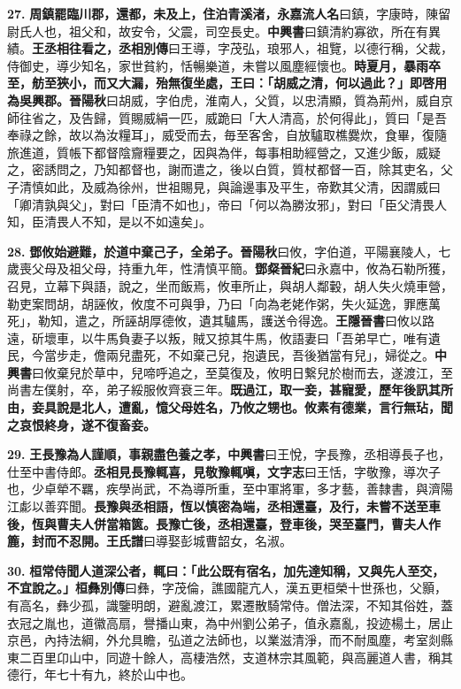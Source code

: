 \textbf{27.} \textbf{周鎮罷臨川郡，還都，未及上，住泊青溪渚，}{\footnotesize \textbf{永嘉流人名}曰鎮，字康時，陳留尉氏人也，祖父和，故安令，父震，司空長史。\textbf{中興書}曰鎮清約寡欲，所在有異績。}\textbf{王丞相往看之，}{\footnotesize \textbf{丞相別傳}曰王導，字茂弘，琅邪人，祖覽，以德行稱，父裁，侍御史，導少知名，家世貧約，恬暢樂道，未嘗以風塵經懷也。}\textbf{時夏月，暴雨卒至，舫至狹小，而又大漏，殆無復坐處，王曰：「胡威之清，何以過此？」即啓用為吳興郡。}{\footnotesize \textbf{晉陽秋}曰胡威，字伯虎，淮南人，父質，以忠清顯，質為荊州，威自京師往省之，及告歸，質賜威絹一匹，威跪曰「大人清高，於何得此」，質曰「是吾奉祿之餘，故以為汝糧耳」，威受而去，毎至客舍，自放驢取樵爨炊，食畢，復隨旅進道，質帳下都督陰齎糧要之，因與為伴，每事相助經營之，又進少飯，威疑之，密誘問之，乃知都督也，謝而遣之，後以白質，質杖都督一百，除其吏名，父子清慎如此，及威為徐州，世祖賜見，與論邊事及平生，帝歎其父清，因謂威曰「卿清孰與父」，對曰「臣清不如也」，帝曰「何以為勝汝邪」，對曰「臣父清畏人知，臣清畏人不知，是以不如遠矣」。}

\textbf{28.} \textbf{鄧攸始避難，於道中棄己子，全弟子。}{\footnotesize \textbf{晉陽秋}曰攸，字伯道，平陽襄陵人，七歲喪父母及祖父母，持重九年，性清慎平簡。\textbf{鄧粲晉紀}曰永嘉中，攸為石勒所獲，召見，立幕下與語，說之，坐而飯焉，攸車所止，與胡人鄰轂，胡人失火燒車營，勒吏案問胡，胡誣攸，攸度不可與爭，乃曰「向為老姥作粥，失火延逸，罪應萬死」，勒知，遣之，所誣胡厚德攸，遺其驢馬，護送令得逸。\textbf{王隱晉書}曰攸以路遠，斫壞車，以牛馬負妻子以叛，賊又掠其牛馬，攸語妻曰「吾弟早亡，唯有遺民，今當步走，儋兩兒盡死，不如棄己兒，抱遺民，吾後猶當有兒」，婦從之。\textbf{中興書}曰攸棄兒於草中，兒啼呼追之，至莫復及，攸明日繋兒於樹而去，遂渡江，至尚書左僕射，卒，弟子綏服攸齊衰三年。}\textbf{既過江，取一妾，甚寵愛，歷年後訊其所由，妾具說是北人，遭亂，憶父母姓名，乃攸之甥也。攸素有德業，言行無玷，聞之哀恨終身，遂不復畜妾。}

\textbf{29.} \textbf{王長豫為人謹順，事親盡色養之孝，}{\footnotesize \textbf{中興書}曰王悅，字長豫，丞相導長子也，仕至中書侍郎。}\textbf{丞相見長豫輒喜，見敬豫輒嗔，}{\footnotesize \textbf{文字志}曰王恬，字敬豫，導次子也，少卓犖不羈，疾學尚武，不為導所重，至中軍將軍，多才藝，善隸書，與濟陽江虨以善弈聞。}\textbf{長豫與丞相語，恆以慎密為端，丞相還臺，及行，未嘗不送至車後，恆與曹夫人併當箱篋。長豫亡後，丞相還臺，登車後，哭至臺門，曹夫人作簏，封而不忍開。}{\footnotesize \textbf{王氏譜}曰導娶彭城曹韶女，名淑。}

\textbf{30.} \textbf{桓常侍聞人道深公者，輒曰：「此公既有宿名，加先達知稱，又與先人至交，不宜說之。」}{\footnotesize \textbf{桓彝別傳}曰彝，字茂倫，譙國龍亢人，漢五更桓榮十世孫也，父顥，有高名，彝少孤，識鑒明朗，避亂渡江，累遷散騎常侍。僧法深，不知其俗姓，蓋衣冠之胤也，道徽高扇，譽播山東，為中州劉公弟子，值永嘉亂，投迹楊土，居止京邑，內持法綱，外允具瞻，弘道之法師也，以業滋清淨，而不耐風塵，考室剡縣東二百里卬山中，同遊十餘人，高棲浩然，支道林宗其風範，與高麗道人書，稱其德行，年七十有九，終於山中也。}

